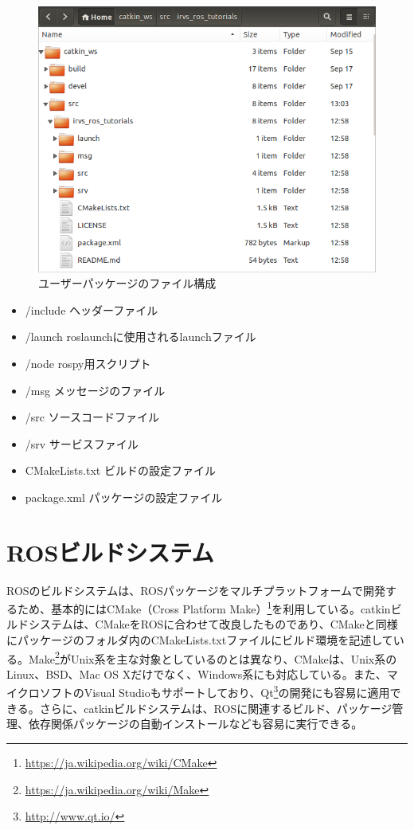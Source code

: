 \begin{figure}[h]
  \centering
  \includegraphics[width=12cm]{pictures/chapter3/pic_03_16.png}
  \caption{ユーザーパッケージのファイル構成}
\end{figure}

\begin{itemize}
\item /include    ヘッダーファイル
\item /launch   roslaunchに使用されるlaunchファイル
\item /node     rospy用スクリプト
\item /msg      メッセージのファイル
\item /src      ソースコードファイル
\item /srv      サービスファイル
\item CMakeLists.txt  ビルドの設定ファイル
\item package.xml   パッケージの設定ファイル
\end{itemize}

\section{ROSビルドシステム}

ROSのビルドシステムは、ROSパッケージをマルチプラットフォームで開発するため、基本的にはCMake（Cross Platform Make）\footnote{\url{https://ja.wikipedia.org/wiki/CMake}}を利用している。catkinビルドシステムは、CMakeをROSに合わせて改良したものであり、CMakeと同様にパッケージのフォルダ内のCMakeLists.txtファイルにビルド環境を記述している。Make\footnote{\url{https://ja.wikipedia.org/wiki/Make}}がUnix系を主な対象としているのとは異なり、CMakeは、Unix系のLinux、BSD、Mac OS Xだけでなく、Windows系にも対応している。また、マイクロソフトのVisual Studioもサポートしており、Qt\footnote{\url{http://www.qt.io/}}の開発にも容易に適用できる。さらに、catkinビルドシステムは、ROSに関連するビルド、パッケージ管理、依存関係パッケージの自動インストールなども容易に実行できる。

